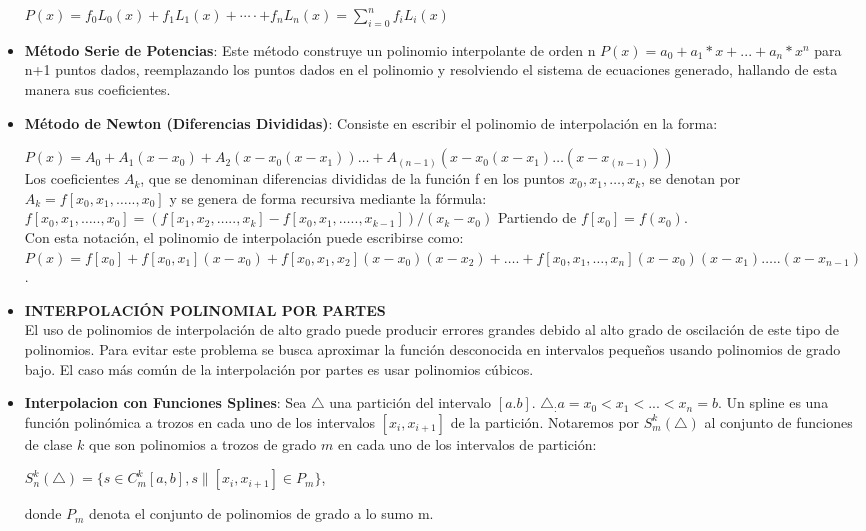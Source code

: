 \documentclass[10pt,a4paper]{article}
\begin{document}
\begin{multicols}{2}
\begin{itemize}
	$ P(x)=f_0 L_0 (x)+f_1 L_1 (x)+⋯⋅+f_n L_n (x)=\sum_{i=0}^{n}f_i L_i (x) $
	
	\item \textbf{Método Serie de Potencias}:
	Este método construye un polinomio interpolante de orden n $P(x)=a_0+a_1*x+...+a_n*x^n $ para n+1 puntos dados, reemplazando los puntos dados en el polinomio y resolviendo el sistema de ecuaciones generado, hallando de esta manera sus coeficientes.
	
	\item \textbf{Método de Newton (Diferencias Divididas)}:
	Consiste en escribir el polinomio de interpolación en la forma:
	
	$P(x)=A_0+A_1 (x-x_0 )+A_2 (x-x_0 (x-x_1 ))…+A_(n-1) (x-x_0 (x-x_1 )…(x-x_(n-1) )) $\\
	Los coeficientes  $A_k$, que se denominan diferencias divididas de la función f en los puntos $x_0,x_1,…, x_k$, se denotan por $A_k=f [x_0,x_1,…..,x_0]$ y se genera de forma recursiva mediante la fórmula: \\
	$f [x_0,x_1,…..,x_0 ]=(f [x_1,x_2,…..,x_k ]-f [x_0,x_1,…..,x_{k-1}]  )/(x_k-x_0 )$
	Partiendo de $f [x_0]=f (x_0)$.\\
	Con esta notación, el polinomio de interpolación puede escribirse como:\\
	$P(x)= f [x_0 ]+f [x_0,x_1]( x-x_0)+ f [x_0,x_1,x_2]( x-x_0) ( x-x_2)+….+ f [x_0,x_1,…,x_n]( x-x_0) ( x-x_1)….. ( x-x_{n-1})$.
	\item \textbf{INTERPOLACIÓN POLINOMIAL POR PARTES}\\
	El uso de polinomios de interpolación de alto grado puede producir errores grandes debido al alto grado de oscilación de este tipo de polinomios. Para evitar este problema se busca aproximar    la  función  desconocida  en  intervalos  pequeños  usando  polinomios  de  grado bajo. El caso más común de la interpolación por partes es usar polinomios cúbicos. 
	\item \textbf{Interpolacion con Funciones Splines}:
	Sea $\triangle$ una partición del intervalo $[a.b]$.
	$\triangle _:  a=x_0<x_1<...<x_n=b$.
	Un spline es una función polinómica a trozos en cada uno de los intervalos $[x_i,x_{i+1}]$ de la partición.
	Notaremos por $S_m^k (\triangle)$ al conjunto de funciones de clase $k$ que son polinomios a trozos de grado $m$ en cada uno de los intervalos de partición:
	
	$S_n^k (\triangle)=\{ s\in C_m^k  [a,b] , s \|[x_i,x_{i+1} ]\in P_m\}$,
	
	donde $P_m$ denota el conjunto de polinomios de grado a lo sumo m.
	

\end{itemize}
\end{multicols}
\end{document}
